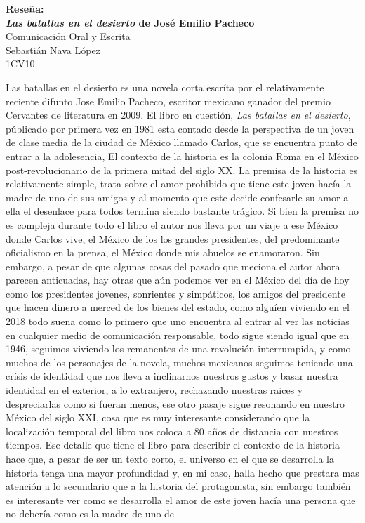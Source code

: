 \documentclass[12pt]{article}
\newcommand{\titlehomework}[4]{\begin{center}{\large \textbf{Reseña:\\{#4}}}\\[2ex]{\large #2}\\#1\\#3\\[2ex]\end{center}}
\begin{document}
\titlehomework{Sebastián Nava López}{Comunicación Oral y Escrita}{1CV10}{\textit{Las
batallas en el desierto}  de José Emilio Pacheco}
Las batallas en el desierto es una novela corta escríta por el relativamente reciente difunto Jose
Emilio Pacheco, escritor mexicano ganador del premio Cervantes de literatura en 2009. El libro en
cuestión, \textit{Las batallas en el desierto}, públicado por primera vez en 1981 esta contado desde
la perspectiva de un joven de clase media de la ciudad de  México llamado Carlos, que se encuentra punto de entrar a la adolesencia,
El contexto de la historia es la colonia Roma en el México post-revolucionario de la primera mitad
del siglo XX. La premisa de la historia es relativamente simple, trata sobre el amor prohibido que
tiene este joven hacía la madre de uno de sus amigos y al momento que este decide confesarle su amor
a ella el desenlace para todos termina siendo bastante trágico. Si bien la premisa no es compleja
durante todo el libro el autor nos lleva por un viaje a ese México donde Carlos vive, el México
de los los grandes presidentes, del predominante oficialismo en la prensa, el México donde mis abuelos se
enamoraron. Sin embargo, a pesar de que algunas cosas del pasado que meciona el autor ahora parecen
anticuadas, hay otras que aún podemos ver en el México del día de hoy como los presidentes jovenes,
sonrientes y simpáticos, los amigos del presidente que hacen dinero a merced de los bienes del
estado, como alguíen viviendo en el 2018 todo suena como lo primero que uno encuentra al entrar al
ver las noticias en cualquier medio de comunicación responsable, todo sigue siendo igual que en
1946, seguimos viviendo los remanentes de una revolución interrumpida, y como muchos de los
personajes de la novela, muchos mexicanos seguimos teniendo una crísis de identidad que nos lleva a
inclinarnos nuestros gustos y basar nuestra identidad en el exterior, a lo extranjero, rechazando
nuestras raices y despreciarlas como si fueran menos, ese otro pasaje sigue resonando en nuestro
México del siglo XXI, cosa que es muy interesante considerando que la localización temporal del
libro nos coloca a 80 años de distancia con nuestros tiempos. Ese detalle que tiene el libro para
describir el contexto de la historia hace que, a pesar de ser un texto corto, el universo en el que
se desarrolla la historia tenga una mayor profundidad y, en mi caso, halla hecho que prestara mas
atención a lo secundario que a la historia del protagonista, sin embargo también es interesante ver
como se desarrolla el amor de este joven hacía una persona que no debería como es la madre de uno de
\end{document}
